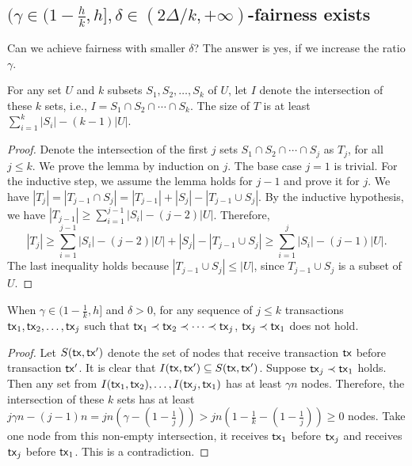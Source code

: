 \documentclass[runningheads]{llncs}
\begin{document}
\subsection{$(\gamma\in(1-\frac{h}{k}, h], \delta\in (2\Delta/k, +\infty)$-fairness exists}
Can we achieve fairness with smaller $\delta$? The answer is yes, if we increase the ratio $\gamma$. 

\begin{lemma}\label{lemma:intersect}
    For any set $U$ and $k$ subsets $S_1, S_2, \dots, S_k$ of $U$, let $I$ denote the intersection of these $k$ sets, i.e., $I = S_1\cap S_2\cap \cdots \cap S_k$. The size of $T$ is at least $\sum_{i=1}^k |S_i| - (k-1)|U|$. 
\end{lemma}

\begin{proof}
    Denote the intersection of the first $j$ sets $S_1\cap S_2\cap\cdots \cap S_j$ as $T_j$, for all $j\le k$. We prove the lemma by induction on $j$. The base case $j=1$ is trivial. For the inductive step, we assume the lemma holds for $j-1$ and prove it for $j$. We have $|T_j| = |T_{j-1}\cap S_j| = |T_{j-1}| + |S_j| - |T_{j-1}\cup S_j|$. By the inductive hypothesis, we have $|T_{j-1}| \ge \sum_{i=1}^{j-1} |S_i| - (j-2)|U|$. Therefore,
    \[|T_j| \ge \sum_{i=1}^{j-1} |S_i| - (j-2)|U| + |S_j| - |T_{j-1}\cup S_j| \ge \sum_{i=1}^{j} |S_i| - (j-1)|U|.\]
    The last inequality holds because $|T_{j-1}\cup S_j|\le |U|$, since $T_{j-1}\cup S_j$ is a subset of $U$.  
\end{proof}

\begin{lemma} \label{lemma:in-k}
When $\gamma\in (1-\frac{1}{k}, h]$ and $\delta > 0$, for any sequence of $j\le k$ transactions $\mathsf{tx}_1, \mathsf{tx}_2, \dots, \mathsf{tx}_{j}$ such that $\mathsf{tx}_1\prec \mathsf{tx}_2\prec \cdots \prec \mathsf{tx}_{j}$, $\mathsf{tx}_{j}\prec \mathsf{tx}_1$ does not hold. 
\end{lemma}

\begin{proof}
    Let $S(\mathsf{tx}, \mathsf{tx}')$ denote the set of nodes that receive transaction $\mathsf{tx}$ before transaction $\mathsf{tx}'$. It is clear that $I(\mathsf{tx}, \mathsf{tx}')\subseteq S(\mathsf{tx}, \mathsf{tx}')$. Suppose $\mathsf{tx}_j\prec\mathsf{tx}_1$ holds. Then any set from $I(\mathsf{tx}_1,\mathsf{tx}_2), \dots, I(\mathsf{tx}_{j}, \mathsf{tx}_{1})$ has at least $\gamma n$ nodes. Therefore, the intersection of these $k$ sets has at least $j\gamma n - (j-1) n = jn(\gamma - (1-\frac{1}{j})) > jn(1-\frac{1}{k} - (1-\frac{1}{j})) \ge 0$ nodes. Take one node from this non-empty intersection, it receives $\mathsf{tx}_1$ before $\mathsf{tx}_j$ and receives $\mathsf{tx}_j$ before $\mathsf{tx}_1$. This is a contradiction. 
\end{proof}
\end{document}
